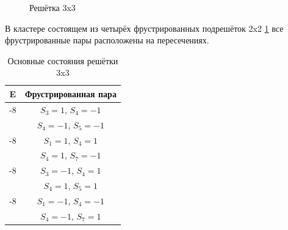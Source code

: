 \documentclass[utf8, babel, sor, jor, amsmath, amssymb, reprint]{elsarticle} %
\begin{document}
\begin{figure}[h]
	\centering
	\caption{Решётка 3x3}
	\label{fig:3x3}
\end{figure}

В кластере состоящем из четырёх фрустрированных подрешёток 2x2 \ref{fig:3x3} все фрустрированные пары расположены на пересечениях.

\begin{table}[h]
	\centering
	\begin{tabular}{|c|c|}
		\hline
		E   &   Фрустрированная пара \\
		\hline
		-8   &  $S_3=1$, $S_4=-1$\\
		&    $S_4=-1$, $S_5=-1$ \\
		\hline
		-8   &  $S_1=1$, $S_4=1$\\
		&    $S_4=1$, $S_7=-1$ \\
		\hline
		-8   &  $S_3=-1$, $S_4=1$\\
			&    $S_4=1$, $S_5=1$ \\
		\hline
		-8   &  $S_1=-1$, $S_4=-1$\\
			&    $S_4=-1$, $S_7=1$ \\
		\hline
	\end{tabular}
	\caption{Основные состояния решётки 3x3}
	\label{tab:gs_3x3}
\end{table} 
\end{document}
